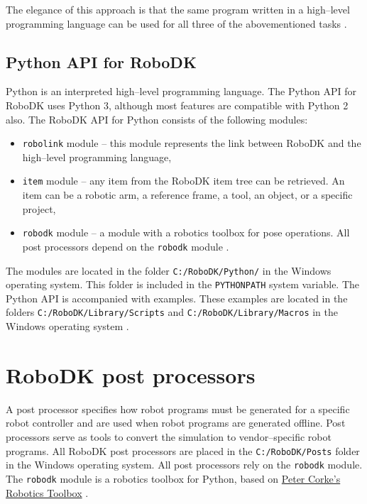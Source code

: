 The elegance of this approach is that the same program written in a high--level programming language can be used for all three of the abovementioned tasks \cite{robodkapi}. 

\subsection{Python API for RoboDK}

Python is an interpreted high--level programming language. The Python API for RoboDK uses Python 3, although most features are compatible with Python 2 also. The RoboDK API for Python consists of the following modules:

\begin{itemize}
    \item \texttt{robolink} module -- this module represents the link between RoboDK and the high--level programming language,
    \item \texttt{item} module -- any item from the RoboDK item tree can be retrieved.  An item can be a robotic arm, a reference frame, a tool, an object, or a specific project,
    \item \texttt{robodk} module -- a module with a robotics toolbox for pose operations. All post processors depend on the \texttt{robodk} module .
\end{itemize}

The modules are located in the folder \texttt{C:/RoboDK/Python/} in the Windows operating system. This folder is included in the \texttt{PYTHONPATH} system variable. The Python API is accompanied with examples. These examples are located in the folders \texttt{C:/RoboDK/Library/Scripts}  and \texttt{C:/RoboDK/Library/Macros}  in the Windows operating system \cite{robodkapipython}.

\section{RoboDK post processors}

A post processor specifies how robot programs must be generated for a specific robot controller and are used when robot programs are generated offline. Post processors serve as tools to convert the simulation to vendor--specific robot programs. All RoboDK post processors are placed in the \texttt{C:/RoboDK/Posts} folder in the Windows operating system. All post processors rely on the \texttt{robodk} module. The \texttt{robodk} module is a robotics toolbox for Python, based on \href{http://petercorke.com/Robotics_Toolbox.html}{Peter Corke’s Robotics Toolbox} \cite{robodkapipython}. 

